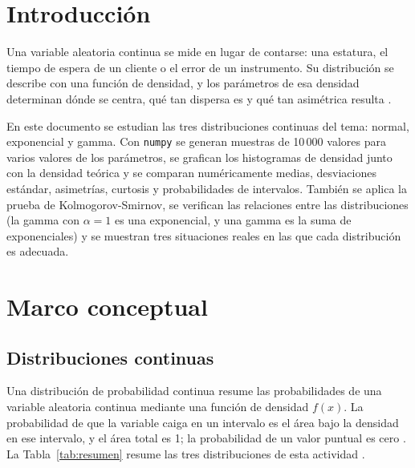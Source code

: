 \documentclass[11pt,letterpaper]{article}
\begin{document}
\portada
\indicegeneral


\section{Introducción}

Una variable aleatoria continua se mide en lugar de contarse: una estatura, el tiempo de espera de un cliente o el error de un instrumento. Su distribución se describe con una función de densidad, y los parámetros de esa densidad determinan dónde se centra, qué tan dispersa es y qué tan asimétrica resulta \parencite{tecnm2026_documento_fuente,brownlee2020}.

En este documento se estudian las tres distribuciones continuas del tema: normal, exponencial y gamma. Con \texttt{numpy} se generan muestras de 10\,000 valores para varios valores de los parámetros, se grafican los histogramas de densidad junto con la densidad teórica y se comparan numéricamente medias, desviaciones estándar, asimetrías, curtosis y probabilidades de intervalos. También se aplica la prueba de Kolmogorov-Smirnov, se verifican las relaciones entre las distribuciones (la gamma con $\alpha = 1$ es una exponencial, y una gamma es la suma de exponenciales) y se muestran tres situaciones reales en las que cada distribución es adecuada.

\section{Marco conceptual}

\subsection{Distribuciones continuas}

Una distribución de probabilidad continua resume las probabilidades de una variable aleatoria continua mediante una función de densidad $f(x)$. La probabilidad de que la variable caiga en un intervalo es el área bajo la densidad en ese intervalo, y el área total es 1; la probabilidad de un valor puntual es cero \parencite{tecnm2026_documento_fuente}. La Tabla~\ref{tab:resumen} resume las tres distribuciones de esta actividad \parencite{tecnm2026_documento_fuente,rice2006}.
\end{document}
